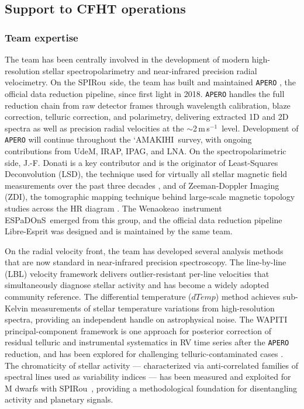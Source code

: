 \documentclass[
    traditabstract,
    longauth,
    onecolumn,
]{aa}
\def \amakihi{`AMAKIHI}
\def \ms{m\,s$^{-1}$}
\def \spi{SPIRou}
\def \esp{ESPaDOnS}
\def \wena{Wenaokeao}
\begin{document}
\subsection{Support to CFHT operations}

\subsubsection{Team expertise}

The team has been centrally involved in the development of modern high-resolution stellar spectropolarimetry and near-infrared precision radial velocimetry. On the \spi\ side, the team has built and maintained \texttt{APERO} \citep{cook_apero_2022}, the official data reduction pipeline, since first light in 2018. \texttt{APERO} handles the full reduction chain from raw detector frames through wavelength calibration, blaze correction, telluric correction, and polarimetry, delivering extracted 1D and 2D spectra as well as precision radial velocities at the $\sim$2\,\ms\ level. Development of \texttt{APERO} will continue throughout the \amakihi\ survey, with ongoing contributions from UdeM, IRAP, IPAG, and LNA. On the spectropolarimetric side, J.-F. Donati is a key contributor and is the originator of Least-Squares Deconvolution (LSD), the technique used for virtually all stellar magnetic field measurements over the past three decades \citep{donati_spectropolarimetric_1997}, and of Zeeman-Doppler Imaging (ZDI), the tomographic mapping technique behind large-scale magnetic topology studies across the HR diagram \citep{donati_large-scale_2008}. The \wena\ instrument \esp\ emerged from this group, and the official data reduction pipeline Libre-Esprit was designed and is maintained by the same team.

On the radial velocity front, the team has developed several analysis methods that are now standard in near-infrared precision spectroscopy. The line-by-line (LBL) velocity framework \citep{artigau_line-by-line_2022} delivers outlier-resistant per-line velocities that simultaneously diagnose stellar activity and has become a widely adopted community reference. The differential temperature ($dTemp$) method \citep{artigau_measuring_2024} achieves sub-Kelvin measurements of stellar temperature variations from high-resolution spectra, providing an independent handle on astrophysical noise. The WAPITI principal-component framework \citep{ould-elhkim_wapiti_2023} is one approach for posterior correction of residual telluric and instrumental systematics in RV time series after the \texttt{APERO} reduction, and has been explored for challenging telluric-contaminated cases \citep{ouldelhkim2026}. The chromaticity of stellar activity --- characterized via anti-correlated families of spectral lines used as variability indices --- has been measured and exploited for M dwarfs with \spi\ \citep{larue2025}, providing a methodological foundation for disentangling activity and planetary signals.
\end{document}
